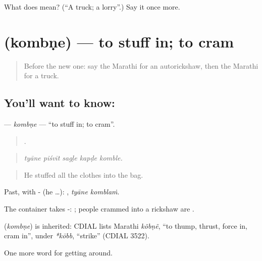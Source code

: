 \begin{tcolorbox}[breakable,colback=teal!4,colframe=teal!35!black,title={Before you move on}]
What does  mean? (\textquotedblleft{}A truck; a lorry\textquotedblright{}.) Say it once more.
\end{tcolorbox}
\section[\texorpdfstring{\mr{कोंबणे} (kombṇe)}{कोंबणे (kombṇe)}]{ (kombṇe) — to stuff in; to cram}

\label{lesson:MR-C400-kombne}



\begin{quote}
Before the new one: say the Marathi for an autorickshaw, then the Marathi for a truck.
\end{quote}

\subsection*{You'll want to know: }
\textbf{} — \emph{kombṇe} — \textquotedblleft{}to stuff in; to cram\textquotedblright{}.

\begin{quote}
    .
\end{quote}

\begin{quote}
\emph{tyāne piśvīt sagḷe kapḍe komble.}
\end{quote}

\begin{quote}
He stuffed all the clothes into the bag.
\end{quote}

Past, with - (he …):  , \emph{tyāne komblaṁ}.

The container takes -:  ; people crammed into a rickshaw are .

\begin{cousinweb}
\textbf{} (\emph{kombṇe}) is inherited: CDIAL lists Marathi \emph{kõbṇẽ}, \textquotedblleft{}to thump, thrust, force in, cram in\textquotedblright{}, under \emph{*kōbb}, \textquotedblleft{}strike\textquotedblright{} (CDIAL 3522).
\end{cousinweb}

\begin{grammarlens}[title={What you've built}]
One more word for getting around.
\end{grammarlens}

